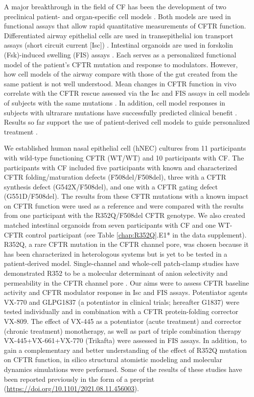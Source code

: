 A major breakthrough in the field of CF has been the development of two preclinical patient- and organ-specific cell models \cite{clarke2013, dekkers2016a, martinovich2017}. Both models are used in functional assays that allow rapid quantitative measurements of CFTR function. Differentiated airway epithelial cells are used in transepithelial ion transport assays (short circuit current [Isc]) \cite{pranke2017}. Intestinal organoids are used in forskolin (Fsk)-induced swelling (FIS) assays \cite{dekkers2013a}. Each serves as a personalized functional model of the patient’s CFTR mutation and response to modulators. However, how cell models of the airway compare with those of the gut created from the same patient is not well understood. Mean changes in CFTR function in vivo correlate with the CFTR rescue assessed via the Isc and FIS assays in cell models of subjects with the same mutations \cite{dekkers2016a, pranke2017}. In addition, cell model responses in subjects with ultrarare mutations have successfully predicted clinical benefit \cite{ramalho2021, mccarthy2018, berkers2019}. Results so far support the use of patient-derived cell models to guide personalized treatment \cite{pranke2019a}.

We established human nasal epithelial cell (hNEC) cultures from 11 participants with wild-type functioning CFTR (WT/WT) and 10 participants with CF. The participants with CF included five participants with known and characterized CFTR folding/maturation defects (F508del/F508del), three with a CFTR synthesis defect (G542X/F508del), and one with a CFTR gating defect (G551D/F508del). The results from these CFTR mutations with a known impact on CFTR function were used as a reference and were compared with the results from one participant with the R352Q/F508del CFTR genotype. We also created matched intestinal organoids from seven participants with CF and one WT-CFTR control participant (see Table \ref{chap:R352Q}.E1* in the data supplement). R352Q, a rare CFTR mutation in the CFTR channel pore, was chosen because it has been characterized in heterologous systems but is yet to be tested in a patient-derived model. Single-channel and whole-cell patch-clamp studies have demonstrated R352 to be a molecular determinant of anion selectivity and permeability in the CFTR channel pore \cite{guinamard1999}. Our aims were to assess CFTR baseline activity and CFTR modulator response in Isc and FIS assays. Potentiator agents VX-770 and GLPG1837 (a potentiator in clinical trials; hereafter G1837) were tested individually and in combination with a CFTR protein-folding corrector VX-809. The effect of VX-445 as a potentiator (acute treatment) and corrector (chronic treatment) monotherapy, as well as part of triple combination therapy VX-445+VX-661+VX-770 (Trikafta) were assessed in FIS assays. In addition, to gain a complementary and better understanding of the effect of R352Q mutation on CFTR function, in silico structural atomistic modeling and molecular dynamics simulations were performed. Some of the results of these studies have been reported previously in the form of a preprint (\href{https://doi.org/10.1101/2021.08.11.456003}{https://doi.org/10.1101/2021.08.11.456003}).


